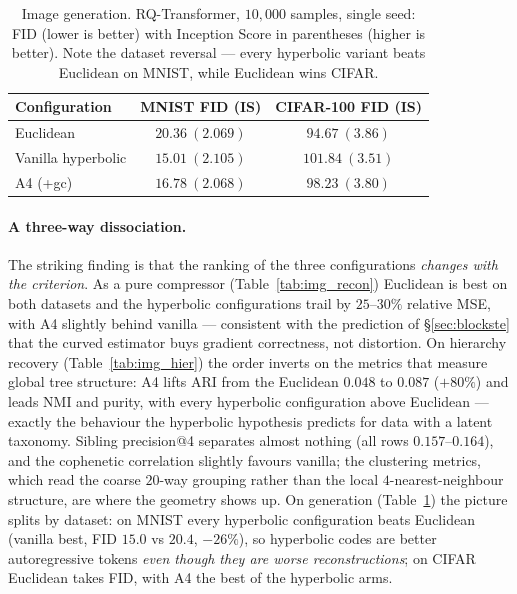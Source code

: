 \documentclass[12pt]{report}
\begin{document}
\begin{table}[h]
\centering
\caption{Image generation. RQ-Transformer, $10{,}000$ samples, single seed: FID (lower is better) with Inception Score in parentheses (higher is better). Note the dataset reversal --- every hyperbolic variant beats Euclidean on MNIST, while Euclidean wins CIFAR.}
\label{tab:img_gen}
\begin{tabular}{lcc}
\hline
Configuration & MNIST FID (IS) & CIFAR-100 FID (IS) \\
\hline
Euclidean & $20.36\ (2.069)$ & $\mathbf{94.67}\ (3.86)$ \\
Vanilla hyperbolic & $\mathbf{15.01}\ (2.105)$ & $101.84\ (3.51)$ \\
A4 (+gc) & $16.78\ (2.068)$ & $98.23\ (3.80)$ \\
\hline
\end{tabular}
\end{table}

\paragraph{A three-way dissociation.} The striking finding is that the ranking of the three configurations \emph{changes with the criterion}. As a pure compressor (Table~\ref{tab:img_recon}) Euclidean is best on both datasets and the hyperbolic configurations trail by $25$--$30\%$ relative MSE, with A4 slightly behind vanilla --- consistent with the prediction of \S\ref{sec:blockste} that the curved estimator buys gradient correctness, not distortion. On hierarchy recovery (Table~\ref{tab:img_hier}) the order inverts on the metrics that measure global tree structure: A4 lifts ARI from the Euclidean $0.048$ to $0.087$ ($+80\%$) and leads NMI and purity, with every hyperbolic configuration above Euclidean --- exactly the behaviour the hyperbolic hypothesis predicts for data with a latent taxonomy. Sibling precision@4 separates almost nothing (all rows $0.157$--$0.164$), and the cophenetic correlation slightly favours vanilla; the clustering metrics, which read the coarse $20$-way grouping rather than the local $4$-nearest-neighbour structure, are where the geometry shows up. On generation (Table~\ref{tab:img_gen}) the picture splits by dataset: on MNIST every hyperbolic configuration beats Euclidean (vanilla best, FID $15.0$ vs $20.4$, $-26\%$), so hyperbolic codes are better autoregressive tokens \emph{even though they are worse reconstructions}; on CIFAR Euclidean takes FID, with A4 the best of the hyperbolic arms.
\end{document}
